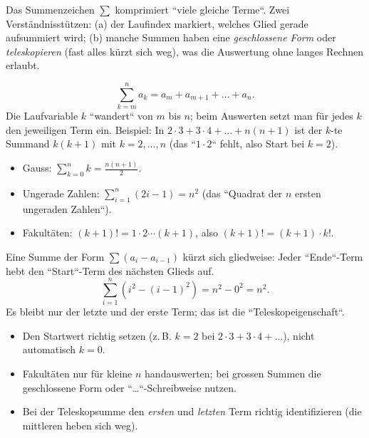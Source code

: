 


Das Summenzeichen $\sum$ komprimiert ``viele gleiche Terme``. Zwei
Verständnisstützen: (a) der Laufindex markiert, welches Glied gerade
aufsummiert wird; (b) manche Summen haben eine \emph{geschlossene
Form} oder \emph{teleskopieren} (fast alles kürzt sich weg), was die
Auswertung ohne langes Rechnen erlaubt.

\begin{werkzeugkasten}
\begin{equation}
  \sum_{k=m}^{n} a_k = a_m + a_{m+1}+\dots+a_n .
\end{equation}
Die Laufvariable $k$ ``wandert`` von $m$ bis $n$; beim Auswerten setzt
man für jedes $k$ den jeweiligen Term ein. Beispiel: In
$2\cdot3+3\cdot4+\dots+n(n+1)$ ist der $k$-te Summand $k(k+1)$ mit
$k=2,\dots,n$ (das ``$1\cdot2$`` fehlt, also Start bei $k=2$).
\end{werkzeugkasten}

\begin{werkzeugkasten}
\begin{itemize}
  \item Gauss: $\sum_{k=0}^{n}k=\frac{n(n+1)}2$.
  \item Ungerade Zahlen: $\sum_{i=1}^{n}(2i-1)=n^2$ (das ``Quadrat der
        $n$ ersten ungeraden Zahlen``).
  \item Fakultäten: $(k+1)!=1\cdot2\cdots(k+1)$, also
        $(k+1)!=(k+1)\cdot k!$.
\end{itemize}
\end{werkzeugkasten}

\begin{werkzeugkasten}[Teleskopiden]
Eine Summe der Form $\sum(a_i-a_{i-1})$ kürzt sich gliedweise:
Jeder ``Ende``-Term hebt den ``Start``-Term des nächsten Glieds auf.
\begin{equation}
  \sum_{i=1}^{n}(i^2-(i-1)^2)=n^2-0^2=n^2 .
\end{equation}
Es bleibt nur der letzte und der erste Term; das ist die
``Teleskopeigenschaft``.
\end{werkzeugkasten}

\begin{achtung}
\begin{itemize}
  \item Den Startwert richtig setzen (z.\,B. $k=2$ bei
        $2\cdot3+3\cdot4+\dots$), nicht automatisch $k=0$.
  \item Fakultäten nur für kleine $n$ handauswerten; bei grossen Summen
        die geschlossene Form oder ``\dots``-Schreibweise nutzen.
  \item Bei der Teleskopsumme den \emph{ersten} und \emph{letzten} Term
        richtig identifizieren (die mittleren heben sich weg).
\end{itemize}
\end{achtung}
